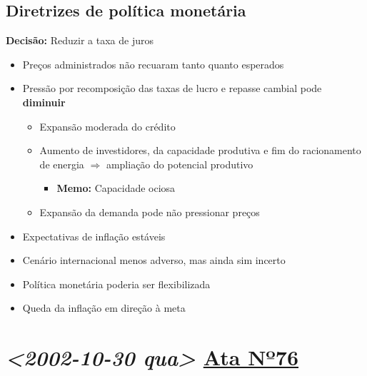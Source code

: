\documentclass[11pt]{article}
\begin{document}
\subsection*{Diretrizes de política monetária}
\label{sec:org6dfdb40}
\textbf{Decisão:} Reduzir a taxa de juros
\begin{itemize}
\item Preços administrados não recuaram tanto quanto esperados
\item Pressão por recomposição das taxas de lucro e repasse cambial pode \textbf{diminuir}
\begin{itemize}
\item Expansão moderada do crédito
\item Aumento de investidores, da capacidade produtiva e fim do racionamento de energia \(\Rightarrow\) ampliação do potencial produtivo
\begin{itemize}
\item \textbf{Memo:} Capacidade ociosa
\end{itemize}
\item Expansão da demanda pode não pressionar preços
\end{itemize}
\item Expectativas de inflação estáveis
\item Cenário internacional menos adverso, mas ainda sim incerto
\item Política monetária poderia ser flexibilizada
\item Queda da inflação em direção à meta
\end{itemize}

\section*{\textit{<2002-10-30 qua> } \href{https://www.bcb.gov.br/publicacoes/atascopom/01102002}{Ata Nº76}}
\label{sec:org4ddc54d}
\end{document}
